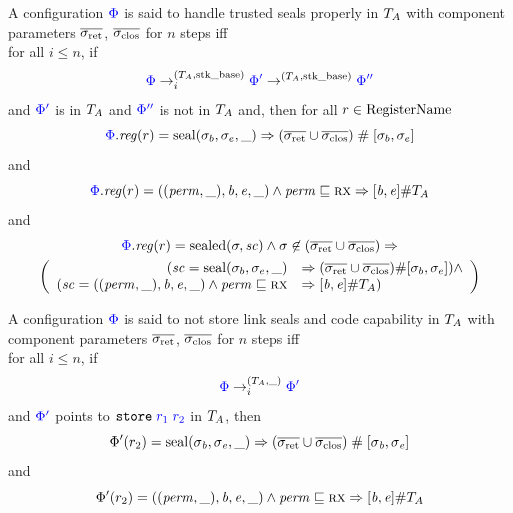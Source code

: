 \documentclass[a4paper]{article}
\begin{document}
\begin{definition}
  \label{def:handle-trusted-seals-properly}
  A configuration $\src{\Phi}$ is said to handle trusted seals properly in $\ta$ with component parameters $\sigrets$, $\sigcloss$ for $n$ steps iff\\
  for all $i \leq n$, if
  \[
    \src{\Phi} \nstep[i]{(\ta,\stkb)} \src{\Phi'} \step[(\ta,\stkb)] \src{\Phi''}
  \]
  and $\src{\Phi'}$ is in $\ta$ and $\src{\Phi''}$ is not in $\ta$ and, then for all $r \in \RegName$
  \[
    \src{\Phi}.\reg(r) = \seal{\sigma_b,\sigma_e,\_} \Rightarrow (\sigrets \cup \sigcloss) \mathrel{\#} [\sigma_b,\sigma_e]
  \]
and
  \[
    \src{\Phi}.\reg(r) = ((\perm,\_),\baddr,\eaddr,\_) \wedge \perm \sqsubseteq \rx \Rightarrow [\baddr,\eaddr] \# \ta
  \]
  and
    \begin{multline*}
      \src{\Phi}.\reg(r) = \sealed{\sigma,\vsc} \wedge \sigma \not\in (\sigrets\cup\sigcloss) \Rightarrow 
      \\  \left(  
      \begin{array}{r l}
        (\vsc = \seal{\sigma_b,\sigma_e,\_} & \Rightarrow (\sigrets\cup\sigcloss) \# [\sigma_b,\sigma_e]) \wedge\\
        ( \vsc = ((\perm,\_),\baddr,\eaddr,\_) \wedge \perm \sqsubseteq \rx & \Rightarrow [\baddr,\eaddr] \# \ta )
      \end{array}
      \right)
  \end{multline*}
\end{definition}

\begin{definition}
  \label{def:never-store-seal-code-cap}
  A configuration $\src{\Phi}$ is said to not store link seals and code capability in $\ta$ with component parameters $\sigrets$, $\sigcloss$ for $n$ steps iff\\
  for all $i \leq n$, if
  \[
    \src{\Phi} \nstep[i]{(\ta,\_)} \src{\Phi'}
  \]
  and $\src{\Phi'}$ points to $\src{\tstore{r_1}{r_2}}$ in $\ta$, then 
\[
  \Phi'(r_2) = \seal{\sigma_\baddr,\sigma_\eaddr,\_} \Rightarrow (\sigrets\cup\sigcloss) \mathrel{\#} [\sigma_\baddr,\sigma_\eaddr]
\]
and
\[
  \Phi'(r_2) = ((\perm,\_),\baddr,\eaddr,\_) \wedge \perm \sqsubseteq \rx \Rightarrow [\baddr,\eaddr] \# \ta
\]
\end{definition}
\end{document}
